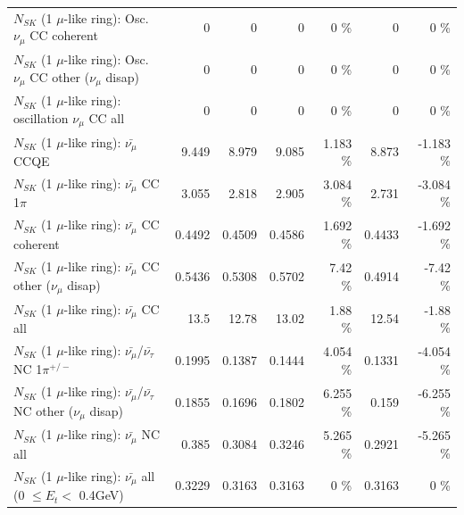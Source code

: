 \begin{table}
\begin{tabular}{| l | r | r | r  r | r  r |}
                        $N_{SK}$ (1 $\mu$-like ring): Osc. $\nu_\mu$ CC coherent &               0 &               0 &               0 &        0 \%  &               0 &        0 \%  \\ 
         $N_{SK}$ (1 $\mu$-like ring): Osc. $\nu_\mu$ CC other ($\nu_\mu$ disap) &               0 &               0 &               0 &        0 \%  &               0 &        0 \%  \\ 
                      $N_{SK}$ (1 $\mu$-like ring): oscillation $\nu_\mu$ CC all &               0 &               0 &               0 &        0 \%  &               0 &        0 \%  \\ 
\hline
\hline
                              $N_{SK}$ (1 $\mu$-like ring): $\bar{\nu_\mu}$ CCQE &           9.449 &           8.979 &           9.085 &    1.183 \%  &           8.873 &   -1.183 \%  \\ 
                         $N_{SK}$ (1 $\mu$-like ring): $\bar{\nu_\mu}$ CC 1$\pi$ &           3.055 &           2.818 &           2.905 &    3.084 \%  &           2.731 &   -3.084 \%  \\ 
                       $N_{SK}$ (1 $\mu$-like ring): $\bar{\nu_\mu}$ CC coherent &          0.4492 &          0.4509 &          0.4586 &    1.692 \%  &          0.4433 &   -1.692 \%  \\ 
        $N_{SK}$ (1 $\mu$-like ring): $\bar{\nu_\mu}$ CC other ($\nu_\mu$ disap) &          0.5436 &          0.5308 &          0.5702 &     7.42 \%  &          0.4914 &    -7.42 \%  \\ 
                          $N_{SK}$ (1 $\mu$-like ring): $\bar{\nu_{\mu}}$ CC all &            13.5 &           12.78 &           13.02 &     1.88 \%  &           12.54 &    -1.88 \%  \\ 
\hline
  $N_{SK}$ (1 $\mu$-like ring): $\bar{\nu_\mu}$/$\bar{\nu_\tau}$ NC 1$\pi^{+/-}$ &          0.1995 &          0.1387 &          0.1444 &    4.054 \%  &          0.1331 &   -4.054 \%  \\ 
$N_{SK}$ (1 $\mu$-like ring): $\bar{\nu_\mu}$/$\bar{\nu_\tau}$ NC other ($\nu_\mu$ disap) &          0.1855 &          0.1696 &          0.1802 &    6.255 \%  &           0.159 &   -6.255 \%  \\ 
                          $N_{SK}$ (1 $\mu$-like ring): $\bar{\nu_{\mu}}$ NC all &           0.385 &          0.3084 &          0.3246 &    5.265 \%  &          0.2921 &   -5.265 \%  \\ 
\hline
   $N_{SK}$ (1 $\mu$-like ring): $\bar{\nu_{\mu}}$ all (0 $\leq E_{t} <$ 0.4GeV) &          0.3229 &          0.3163 &          0.3163 &        0 \%  &          0.3163 &        0 \%  \\ 

\end{tabular}
\end{table}
